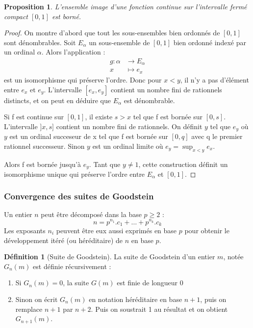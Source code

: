 \documentclass[french]{article}
\theoremstyle{definition}
\newtheorem{definition}[subsubsection]{Définition}
\theoremstyle{plain}
\newtheorem{proposition}[subsubsection]{Proposition}
\theoremstyle{plain}
\theoremstyle{plain}
\theoremstyle{plain}
\theoremstyle{plain}
\begin{document}
\begin{proposition}
	L'ensemble image d'une fonction continue sur l'intervalle fermé compact \( [0,1] \) est borné.
\end{proposition}

\begin{proof}
	On montre d'abord que tout les sous-ensembles bien ordonnés de \( [0,1] \) sont dénombrables. Soit \( E_{\alpha} \) un sous-ensemble de \( [0,1] \) bien ordonné indexé par un ordinal \( \alpha \). Alors l'application :
\begin{align*}	
	g : \alpha &\rightarrow E_{\alpha} \\
	x &\mapsto e_{x}
\end{align*}
est un isomorphisme qui préserve l'ordre. Donc pour \( x < y \), il n'y a pas d'élément entre \( e_{x} \) et \( e_{y} \). L'intervalle \( [e_{x},e_{y}] \) contient un nombre fini de rationnels distincts, et on peut en déduire que \( E_{\alpha} \) est dénombrable.

Si f est continue sur \( [0,1] \), il existe \( s > x \) tel que f est bornée sur \( [0,s] \). L'intervalle \( ]x,s] \) contient un nombre fini de rationnels. On définit \( y \) tel que \( e_{y} \) où \( y \) est un ordinal succeseur de x tel que f est bornée sur \( [0,q] \) avec q le premier rationnel successeur. Sinon \( y \) est un ordinal limite où \( e_y = \sup_{x<y} e_{x} \). 

Alors f est bornée jusqu'à \( e_{y} \). Tant que \( y \neq 1 \), cette construction définit un isomorphisme unique qui préserve l'ordre entre \( E_{\alpha} \) et \( [0,1] \).

\end{proof}

\subsubsection{Convergence des suites de Goodstein}

\par Un entier \( n \) peut être décomposé dans la base \( p \geq 2 \) :
\begin{equation*}
	n = p^{n_{1}}.c_{1} + \ldots + p^{n_{k}}.c_{k}
\end{equation*}
Les exposants \( n_{i} \) peuvent être eux aussi exprimés en base \( p \) pour obtenir le développement itéré (ou héréditaire) de \( n \) en base \( p \).

\begin{definition}[Suite de Goodstein]
La suite de Goodstein d'un entier \( m \), notée \( G_{n}(m) \) est définie récursivement :
\begin{enumerate}[label = (\roman*)]
	\item Si \( G_{n}(m) = 0 \), la suite \( G(m) \) est finie de longueur 0
	\item Sinon on écrit \( G_{n}(m) \) en notation héréditaire en base \( n+1 \), puis on remplace \( n+1 \) par \( n+2 \). Puis on soustrait 1 au résultat et on obtient \( G_{n+1}(m) \).
\end{enumerate}
\end{definition}
\end{document}
